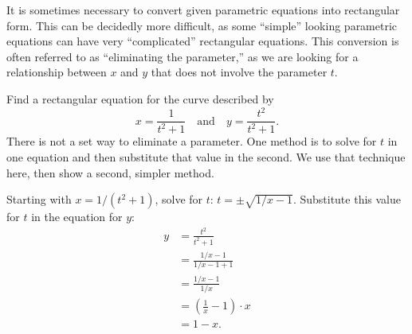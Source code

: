 It is  sometimes necessary to convert given parametric equations into rectangular form. This can be decidedly more difficult, as some ``simple'' looking parametric equations can have very ``complicated'' rectangular equations. This conversion is often referred to as ``eliminating the parameter,'' as we are looking for a relationship between $x$ and $y$ that does not involve the parameter $t$.

\begin{example}\label{ex_pareq7}
Find a rectangular equation for the curve described by
\[x= \frac{1}{t^2+1}\quad \text{and}\quad y=\frac{t^2}{t^2+1}.\]
\solution
There is not a set way to eliminate a parameter. One method is to solve for $t$ in one equation and then substitute that value in the second. We use that technique here, then show a second, simpler method.

Starting with $x= 1/(t^2+1)$, solve for $t$: $ t = \pm\sqrt{1/x-1}$. Substitute this value for $t$ in the equation for $y$:
{\allowdisplaybreaks
\begin{align*}
 y &= \frac{t^2}{t^2 +1} \\
		&= \frac{1/x-1}{1/x-1+1} \\
		&= \frac{1/x - 1}{1/x} \\
		&= \left(\frac1x-1\right)\cdot x \\
		&= 1-x.
\end{align*}}



\end{example}
